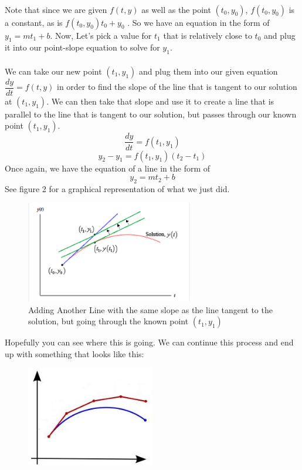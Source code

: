 \documentclass[font =22]{report}
\begin{document}
\paragraph{}
Note that since we are given $f(t,y)$ as well as the point $(t_0,y_0)$, $f(t_0,y_0)$ is a constant, as is $f(t_0,y_0)t_0 + y_0$ .  So we have an equation in the form of $y_1=mt_1+b$. Now, Let's pick a value for $t_1$ that is relatively close to $t_0$ and plug it into our point-slope equation to solve for $y_1$.
\paragraph{}
 We can take our new point $(t_1,y_1)$ and plug them into our given equation $ \dfrac{dy}{dt}=f(t,y)$ in order to find the slope of the line that is tangent to our solution at $(t_1,y_1)$. We can then take that slope and use it to create a line that is parallel to the line that is tangent to our solution, but passes through our known point $(t_1,y_1)$. 
\[
\frac{dy}{dt} = f(t_1,y_1)
\] 
\[
y_2 - y_1 = f(t_1,y_1)(t_2 - t_1) 
\]
Once again, we have the equation of a line in the form of 
\[
y_2 = mt_2+b
\]
See figure 2 for a graphical representation of what we just did.

\begin{figure}[H]
  
  \centering
   \includegraphics[width=0.65\textwidth]{figures/TLA2}
   \caption{ Adding Another Line with the same slope as the line tangent to the solution, but going through the known point $(t_1,y_1)$}
\end{figure}


Hopefully you can see where this is going. We can continue this process and end up with something that looks like this:

\begin{figure}[H]
  \centering
   \includegraphics[width=0.5\textwidth]{figures/TLA3}
 
\end{figure}
\end{document}
